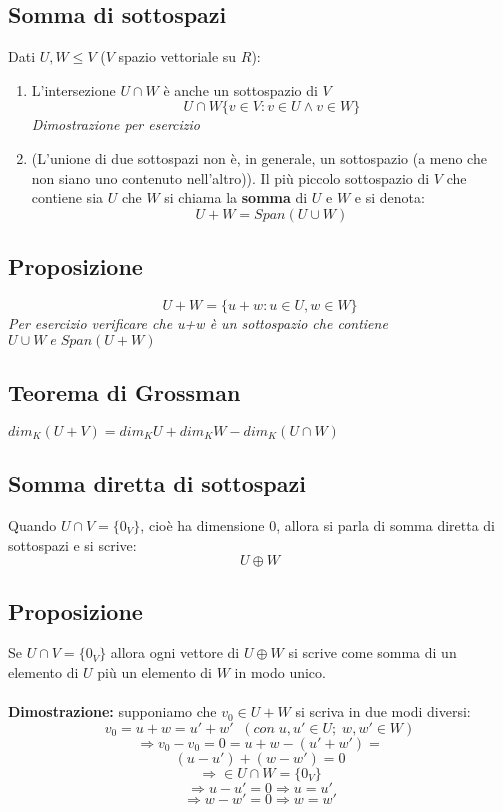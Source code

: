 \subsection{Somma di sottospazi}
Dati $U,W\leq V$ ($V$ spazio vettoriale su $R$):
\begin{enumerate}
	\item L'intersezione $U\cap W$ è anche un sottospazio di $V$
	\[U\cap W\{v\in V: v\in U\land v\in W\}\]
	\textit{Dimostrazione per esercizio}
	\item (L'unione di due sottospazi non è, in generale, un sottospazio (a meno che non siano uno contenuto nell'altro)).
	Il più piccolo sottospazio di $V$ che contiene sia $U$ che $W$ si chiama la \textbf{somma} di $U$ e $W$ e si denota:
	\[U+W=Span(U\cup W)\]
\end{enumerate}

\subsection{Proposizione}
\[U+W=\{u+w: u\in U,w\in W\}\]
\textit{Per esercizio verificare che u+w è un sottospazio che contiene $U\cup W\;e\;Span(U+W)$}

\subsection{Teorema di Grossman}
$dim_K(U+V)=dim_KU+dim_KW-dim_K(U\cap W)$

\subsection{Somma diretta di sottospazi}
Quando $U\cap V=\{0_V\}$, cioè ha dimensione $0$, allora si parla di somma diretta di sottospazi e si scrive:
\[U\oplus W\]

\subsection{Proposizione}
Se $U\cap V=\{0_V\}$ allora ogni vettore di $U\oplus W$ si scrive come somma di un elemento di $U$ più un elemento di $W$ in modo unico.
\\
\\\textbf{Dimostrazione:} supponiamo che $v_0\in U+W$ si scriva in due modi diversi:
\[v_0=u+w=u'+w'\;\;(con\;u,u'\in U;\;w,w'\in W)\]
\[\Rightarrow v_0-v_0=0=u+w-(u'+w')=\]
\[(u-u')+(w-w')=0\]
\[\Rightarrow \in U\cap W=\{0_V\}\]
\[\Rightarrow u-u'=0\Rightarrow u=u'\]
\[\Rightarrow w-w'=0\Rightarrow w=w'\]
